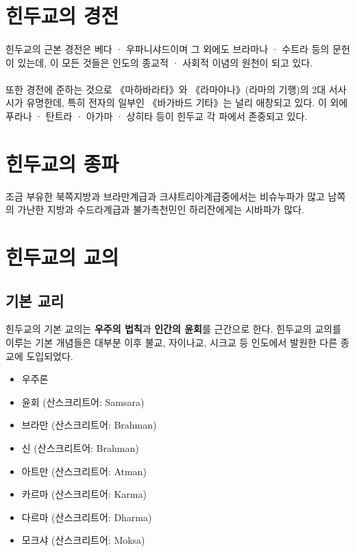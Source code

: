 \documentclass[12pt, a4paper, oneside]{book}
\let\stdsection\section
\renewcommand\section{\newpage\stdsection}
\begin{document}
\section{힌두교의 경전}

\paragraph{}
힌두교의 근본 경전은 베다 · 우파니샤드이며 그 외에도 브라마나 · 수트라 등의 문헌이 있는데, 이 모든 것들은 인도의 종교적 · 사회적 이념의 원천이 되고 있다. 
\paragraph{}
또한 경전에 준하는 것으로 《마하바라타》와 《라마야나》(라마의 기행)의 2대 서사시가 유명한데, 특히 전자의 일부인 《바가바드 기타》는 널리 애창되고 있다. 
이 외에 푸라나 · 탄트라 · 아가마 · 상히타 등이 힌두교 각 파에서 존중되고 있다.





\section{힌두교의 종파}


조금 부유한 북쪽지방과 브라만계급과 크샤트리아계급중에서는 비슈누파가 많고 남쪽의 가난한 지방과 수드라계급과 불가촉천민인 하리잔에게는 시바파가 많다.





\section{힌두교의 교의}



\subsection{기본 교리}
힌두교의 기본 교의는 \textbf{우주의 법칙}과 \textbf{인간의 윤회}를 근간으로 한다. 
힌두교의 교의를 이루는 기본 개념들은 대부분 이후 불교, 자이나교, 시크교 등 인도에서 발원한 다른 종교에 도입되었다.


			\begin{itemize}[topsep=0.0em, parsep=0.0em, itemsep=0em, leftmargin=12.0em, labelwidth=3em, labelsep=3em] 
			\item 우주론
			\item 윤회 (산스크리트어: Samsara)
			\item 브라만 (산스크리트어: Brahman)
			\item 신 (산스크리트어: Brahman)
			\item 아트만 (산스크리트어: Atman)
			\item 카르마 (산스크리트어: Karma)
			\item 다르마 (산스크리트어: Dharma)
			\item 모크샤 (산스크리트어: Moksa)
			\end{itemize}
\end{document}
